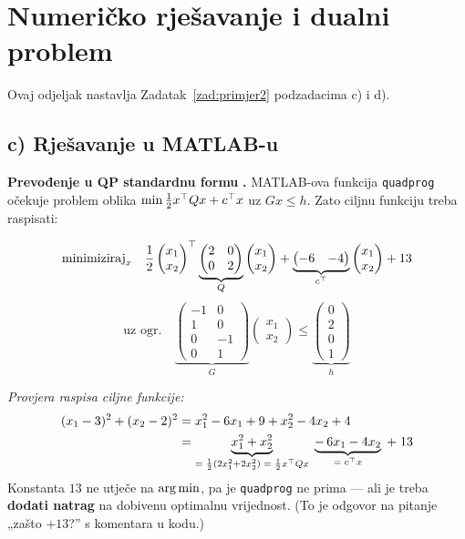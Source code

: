 \section{Numeričko rješavanje i dualni problem}
\label{sec:primjer2-dual}

Ovaj odjeljak nastavlja Zadatak~\ref{zad:primjer2} podzadacima c) i d).

\subsection{c) Rješavanje u MATLAB-u}

\textbf{Prevođenje u QP standardnu formu} \textbf{.} MATLAB-ova
funkcija \texttt{quadprog} očekuje problem oblika
$\min \tfrac12 x^{\top} Q x + c^{\top} x$ uz $Gx \le h$. Zato ciljnu funkciju treba
raspisati:

\[
\text{minimiziraj}_x \quad
\frac{1}{2}\begin{pmatrix}x_1\\x_2\end{pmatrix}^{\top}
\underbrace{\begin{pmatrix}2&0\\0&2\end{pmatrix}}_{Q}
\begin{pmatrix}x_1\\x_2\end{pmatrix}
+ \underbrace{\begin{pmatrix}-6 & -4\end{pmatrix}}_{c^{\top}}
\begin{pmatrix}x_1\\x_2\end{pmatrix} + 13
\]
\[
\text{uz ogr.}\quad
\underbrace{\begin{pmatrix}
-1 & 0 \\ 1 & 0 \\ 0 & -1 \\ 0 & 1
\end{pmatrix}}_{G}
\begin{pmatrix}x_1\\x_2\end{pmatrix}
\le
\underbrace{\begin{pmatrix}0\\2\\0\\1\end{pmatrix}}_{h}
\]

\emph{Provjera raspisa ciljne funkcije:}
\begin{align}
(x_1-3)^2 + (x_2-2)^2
&= x_1^2 - 6x_1 + 9 + x_2^2 - 4x_2 + 4 \\
&= \underbrace{x_1^2 + x_2^2}_{=\;\frac12(2x_1^2+2x_2^2)\;=\;\frac12 x^{\top} Qx}
 \;\underbrace{-\,6x_1 - 4x_2}_{=\;c^{\top} x}\; + \;13
\end{align}
\checkmark \; Konstanta $13$ ne utječe na $\operatorname*{arg\,min}$, pa je \texttt{quadprog} ne
prima --- ali je treba \textbf{dodati natrag} na dobivenu optimalnu vrijednost.
(To je odgovor na pitanje „zašto $+13$?” s komentara u kodu.)

